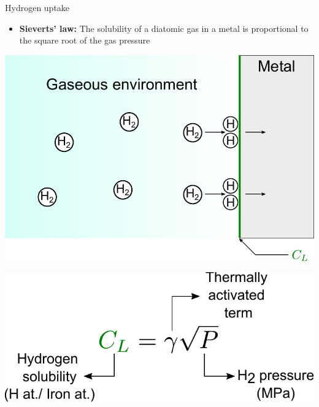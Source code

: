 \documentclass[9pt]{beamer}
\begin{document}
\begin{frame}{Hydrogen uptake}

\begin{itemize}
	\item \textbf{Sieverts' law:} The solubility of a diatomic gas in a metal is proportional to the square root of the gas pressure
\end{itemize}

\vspace{1cm}

    \begin{minipage}{0.55\textwidth}
        \centering
        \includegraphics[width=\textwidth]{Images/H2_uptake.pdf}
    \end{minipage}
    \hfill
    \begin{minipage}{0.42\textwidth}
        \centering
        \includegraphics[width=\textwidth]{Images/sieverts.pdf}
    \end{minipage}

\end{frame}

\end{document}
